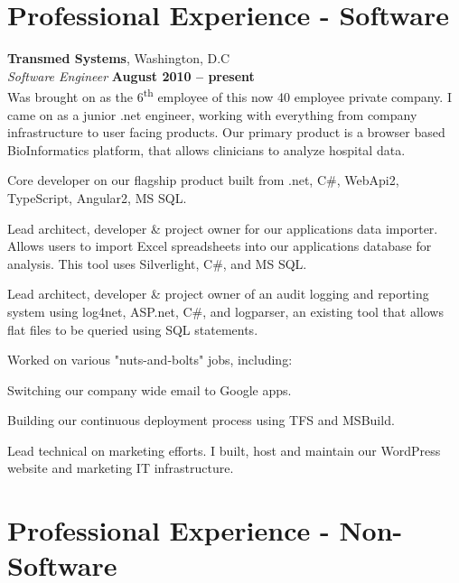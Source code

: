\documentclass[margin,line]{resume}
\begin{document}
\begin{resume}
\section{\mysidestyle Professional Experience - Software}

    \textbf{Transmed Systems}, Washington, D.C \vspace{1mm}\\\vspace{1mm}%
    \textsl{Software Engineer} \hfill \textbf{August 2010 -- present}\vspace{1mm}\\\vspace{0mm}%
	Was brought on as the 6\textsuperscript{th} employee of this now 40 employee private company. I came on as a junior .net engineer, working with everything from company infrastructure to user facing products. Our primary product is a browser based BioInformatics platform, that allows clinicians to analyze hospital data.
\vspace{-3mm}\\\vspace{1mm}
    \begin{list2}
    \item Core developer on our flagship product built from .net, C\#, WebApi2, TypeScript, Angular2, MS SQL.
    \item Lead architect, developer \& project owner for our applications data importer. Allows users to import Excel spreadsheets into our applications database for analysis. This tool uses Silverlight, C\#, and MS SQL.
    \item Lead architect, developer \& project owner of an audit logging and reporting system using log4net, ASP.net, C\#, and logparser, an existing tool that allows flat files to be queried using SQL statements.
  \end{list2}
Worked on various "nuts-and-bolts" jobs, including:
\begin{list2}
    \item Switching our company wide email to Google apps.
    \item Building our continuous deployment process using TFS and MSBuild.
    \item Lead technical on marketing efforts. I built, host and maintain our WordPress website and marketing IT infrastructure.
  \end{list2}
	
 \section{\mysidestyle Professional Experience - Non-Software}
   

\end{resume}
\end{document}
